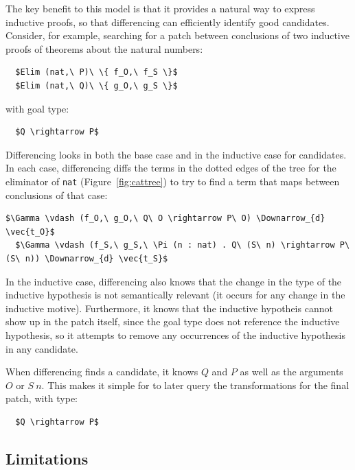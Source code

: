 The key benefit to this model is that it provides a natural way to express inductive proofs, so
that differencing can efficiently identify good candidates.
Consider, for example, searching for a patch between conclusions of two inductive proofs of theorems about the natural numbers:

\begin{lstlisting}
  $Elim (nat,\ P)\ \{ f_O,\ f_S \}$
  $Elim (nat,\ Q)\ \{ g_O,\ g_S \}$ 
\end{lstlisting}
with goal type:

\begin{lstlisting}
  $Q \rightarrow P$
\end{lstlisting}

Differencing looks in both the base case and in the inductive case for candidates.
In each case, differencing diffs the terms in the dotted edges of the tree for the eliminator of \lstinline{nat} (Figure~\ref{fig:cattree}) to
try to find a term that maps between conclusions of that case:

\begin{lstlisting}[language=coq]
  $\Gamma \vdash (f_O,\ g_O,\ Q\ O \rightarrow P\ O) \Downarrow_{d} \vec{t_O}$
  $\Gamma \vdash (f_S,\ g_S,\ \Pi (n : nat) . Q\ (S\ n) \rightarrow P\ (S\ n)) \Downarrow_{d} \vec{t_S}$
\end{lstlisting}
In the inductive case, differencing also knows that the change in the type of the inductive hypothesis is not semantically relevant (it occurs for any change in the inductive motive).
Furthermore, it knows that the inductive hypotheis cannot show up in the patch itself, since the goal type does not reference the inductive hypothesis,
so it attempts to remove any occurrences of the inductive hypothesis in any candidate.

When differencing finds a candidate, it knows $Q$ and $P$ as well as the arguments $O$ or $S\ n$.
This makes it simple for \sysname to later query the transformations for the final patch, with type:

\begin{lstlisting}
  $Q \rightarrow P$
\end{lstlisting}

\subsection{Limitations}
\label{sec:pumpkin-diff-limitations}


